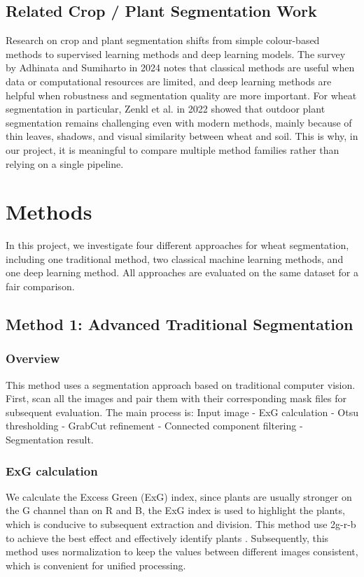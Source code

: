 \documentclass[conference]{IEEEtran}
\begin{document}
\subsection{Related Crop / Plant Segmentation Work}
Research on crop and plant segmentation shifts from simple colour-based methods to supervised learning methods and deep learning models. The survey by Adhinata and Sumiharto in 2024 \cite{survey} notes that classical methods are useful when data or computational resources are limited, and deep learning methods are helpful when robustness and segmentation quality are more important. For wheat segmentation in particular, Zenkl et al. in 2022 \cite{zenkl} showed that outdoor plant segmentation remains challenging even with modern methods, mainly because of thin leaves, shadows, and visual similarity between wheat and soil. This is why, in our project, it is meaningful to compare multiple method families rather than relying on a single pipeline.


\section{Methods}
In this project, we investigate four different approaches for wheat segmentation, including one traditional method, two classical machine learning methods, and one deep learning method. All approaches are evaluated on the same dataset for a fair comparison.


\subsection{Method 1: Advanced Traditional Segmentation}

\subsubsection{Overview}
This method uses a segmentation approach based on traditional computer vision. First, scan all the images and pair them with their corresponding mask files for subsequent evaluation. The main process is: Input image - ExG calculation - Otsu thresholding - GrabCut refinement - Connected component filtering - Segmentation result.
\subsubsection{ExG calculation}
We calculate the Excess Green (ExG) index, since plants are usually stronger on the G channel than on R and B, the ExG index is used to highlight the plants, which is conducive to subsequent extraction and division. This method use 2g-r-b to achieve the best effect and effectively identify plants \cite{exg}. Subsequently, this method uses normalization to keep the values between different images consistent, which is convenient for unified processing.
\end{document}
